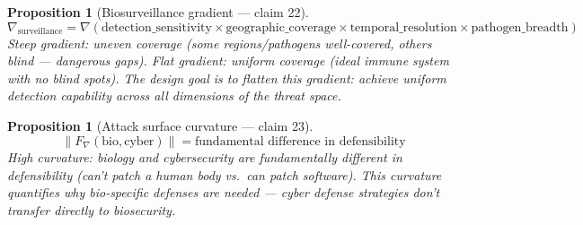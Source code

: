 \documentclass[11pt,a4paper]{article}
\newtheorem{proposition}[definition]{Proposition}
\begin{document}
\begin{proposition}[Biosurveillance gradient --- claim 22]
\label{prop:surv_grad}
\[
  \nabla_{\text{surveillance}} = \nabla\left(\text{detection\_sensitivity}
    \times \text{geographic\_coverage} \times
    \text{temporal\_resolution} \times \text{pathogen\_breadth}\right)
\]
Steep gradient: uneven coverage (some regions/pathogens well-covered,
others blind --- dangerous gaps). Flat gradient: uniform coverage
(ideal immune system with no blind spots). The design goal is to
flatten this gradient: achieve uniform detection capability across
all dimensions of the threat space.
\end{proposition}

\begin{proposition}[Attack surface curvature --- claim 23]
\label{prop:attack_curv}
\[
  \|F_\nabla(\text{bio}, \text{cyber})\| = \text{fundamental difference
    in defensibility}
\]
High curvature: biology and cybersecurity are fundamentally different
in defensibility (can't patch a human body vs.\ can patch software).
This curvature quantifies why bio-specific defenses are needed ---
cyber defense strategies don't transfer directly to biosecurity.
\end{proposition}
\end{document}
